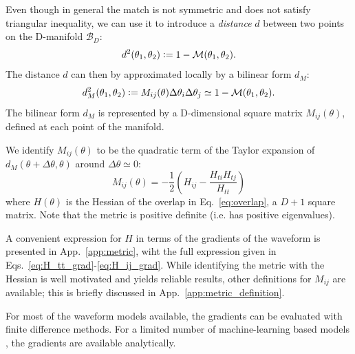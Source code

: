 \documentclass[twocolumn,showpacs,preprintnumbers,nofootinbib,prd,
superscriptaddress,10pt]{revtex4-2}
\begin{document}
Even though in general the match is not symmetric and does not satisfy triangular inequality, we can use it to introduce a {\it distance} $d$ between two points on the D-manifold $\mathcal{B}_D$:
\begin{align}\label{eq:distance}
	d^2(\theta_1,\theta_2) \vcentcolon= 1 - \mathcal{M}(\theta_1,\theta_2).
\end{align}
The distance $d$ can then by approximated locally by a bilinear form $d_M$:
\begin{align}\label{eq:metric_definition}
	d_M^2(\theta_1,\theta_2) \vcentcolon= M_{ij}(\theta) \Delta\theta_i \Delta\theta_j \simeq 1 - \mathcal{M}(\theta_1,\theta_2).
\end{align}
The bilinear form $d_M$ is represented by a D-dimensional square matrix $M_{ij}(\theta)$, defined at each point of the manifold.

We identify $M_{ij}(\theta)$ to be the quadratic term of the Taylor expansion of ${d_M(\theta+\Delta\theta,\theta)}$ around $\Delta\theta\simeq 0$:
\begin{equation}\label{eq:metric_expression}
	M_{ij}(\theta) = - \frac{1}{2} \left( H_{ij} - \frac{H_{ti}H_{tj}}{H_{tt}} \right)
\end{equation}
where $H(\theta)$ is the Hessian of the overlap in Eq.~\eqref{eq:overlap}, a $D+1$ square matrix.
Note that the metric is positive definite (i.e. has positive eigenvalues).

A convenient expression for $H$ in terms of the gradients of the waveform is presented in App.~\ref{app:metric}, wiht the full expression given in Eqs.~\eqref{eq:H_tt_grad}-\eqref{eq:H_ij_grad}.
While identifying the metric with the Hessian is well motivated and yields reliable results, other definitions for $M_{ij}$ are available; this is briefly discussed in App.~\ref{app:metric_definition}.

For most of the waveform models available, the gradients can be evaluated with finite difference methods. For a limited number of machine-learning based models \cite{Chua:2018woh, Khan:2020fso, PhysRevD.103.043020, Thomas:2022rmc, Tissino:2022thn}, the gradients are available analytically.
\end{document}
